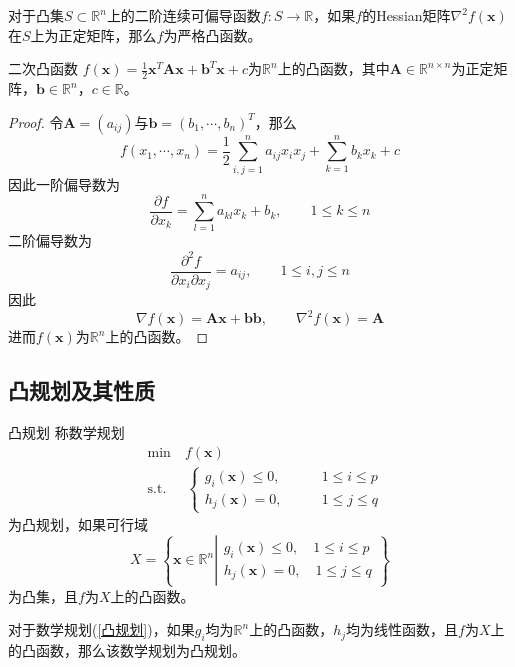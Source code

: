\documentclass[lang = cn, scheme = chinese, thmcnt = section]{elegantbook}
\newcommand{\R}{\mathbb{R}}            %
\newcommand{\sub}{\subset}             %
\newcommand{\bs}{\boldsymbol}          %
\begin{document}
\begin{theorem}
	对于凸集$S\sub\R^n$上的二阶连续可偏导函数$f:S\to\R$，如果$f$的Hessian矩阵$\nabla^2 f(\bs{x})$在$S$上为正定矩阵，那么$f$为严格凸函数。
\end{theorem}

\begin{proposition}{二次凸函数}
	$f(\bs{x})=\frac{1}{2}\bs{x}^T\bs{Ax}+\bs{b}^T\bs{x}+c$为$\R^n$上的凸函数，其中$\bs{A}\in\R^{n\times n}$为正定矩阵，$\bs{b}\in \R^n$，$c\in\R$。
\end{proposition}

\begin{proof}
	令$\bs{A}=(a_{ij})$与$\bs{b}=(b_1,\cdots,b_n)^T$，那么
	$$
	f(x_1,\cdots,x_n)
	=\frac{1}{2}\sum_{i,j=1}^{n}a_{ij}x_{i}x_j+\sum_{k=1}^{n}b_kx_k+c
	$$
	因此一阶偏导数为
	$$
	\frac{\partial f}{\partial x_k}=\sum_{l=1}^{n}a_{kl}x_{k}+b_k,\qquad 
	1\le k \le n
	$$
	二阶偏导数为
	$$
	\frac{\partial^2 f}{\partial x_i \partial x_j}=a_{ij},\qquad 1\le i,j \le n
	$$
	因此
	$$
	\nabla f(\bs{x})=\bs{Ax}+\bs{bb},\qquad 
	\nabla^2 f(\bs{x})=\bs{A}
	$$
	进而$f(\bs{x})$为$\R^n$上的凸函数。
\end{proof}

\subsection{凸规划及其性质}

\begin{definition}{凸规划}
	称数学规划
	\begin{align*}\label{凸规划}
		& \text{min}  \quad f(\bs{x})\\
		& \text{s.t.} \;\, \quad \begin{cases}
			g_i(\bs{x})\le 0,\qquad & 1\le i \le p\\
			h_j(\bs{x})=0,\qquad & 1\le j \le q
		\end{cases}\tag{*}
	\end{align*}
	为凸规划，如果可行域
	$$
	X=\left\{ 
	\bs{x}\in\R^n\left|
	\begin{aligned}
		g_i(\bs{x})\le 0,\quad 1\le i \le p\\
		h_j(\bs{x})=0,\quad 1\le j \le q
	\end{aligned}\right.
	\right\}
	$$
	为凸集，且$f$为$X$上的凸函数。
\end{definition}

\begin{theorem}
	对于数学规划(\ref{凸规划})，如果$g_i$均为$\R^n$上的凸函数，$h_j$均为线性函数，且$f$为$X$上的凸函数，那么该数学规划为凸规划。
\end{theorem}
\end{document}
